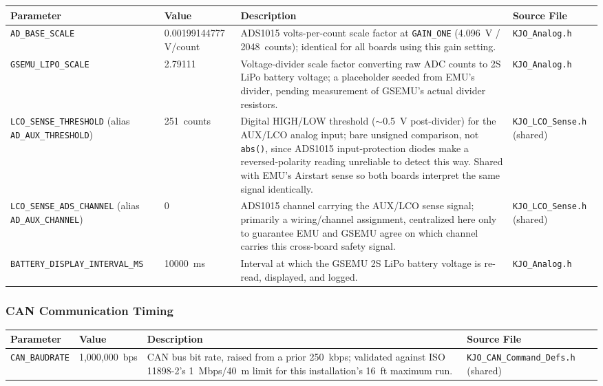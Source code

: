 ﻿\documentclass[11pt,letterpaper]{article}
\begin{document}
\begingroup
\footnotesize
\begin{longtable}{@{}p{3.2cm}p{2.4cm}p{6.2cm}p{2.6cm}@{}}
\toprule
Parameter & Value & Description & Source File \\
\midrule
\texttt{AD\_\allowbreak BASE\_\allowbreak SCALE} & 0.00199144777 V/count & ADS1015 volts-per-count scale factor at \texttt{GAIN\_\allowbreak ONE} (4.096~V / 2048~counts); identical for all boards using this gain setting. & \texttt{KJO\_\allowbreak Analog.h} \\
\texttt{GSEMU\_\allowbreak LIPO\_\allowbreak SCALE} & 2.79111 & Voltage-divider scale factor converting raw ADC counts to 2S LiPo battery voltage; a placeholder seeded from EMU's divider, pending measurement of GSEMU's actual divider resistors. & \texttt{KJO\_\allowbreak Analog.h} \\
\texttt{LCO\_\allowbreak SENSE\_\allowbreak THRESHOLD} (alias \texttt{AD\_\allowbreak AUX\_\allowbreak THRESHOLD}) & 251~counts & Digital HIGH/LOW threshold ($\sim$0.5~V post-divider) for the AUX/LCO analog input; bare unsigned comparison, not \texttt{abs()}, since ADS1015 input-protection diodes make a reversed-polarity reading unreliable to detect this way. Shared with EMU's Airstart sense so both boards interpret the same signal identically. & \texttt{KJO\_\allowbreak LCO\_\allowbreak Sense.h} (shared) \\
\texttt{LCO\_\allowbreak SENSE\_\allowbreak ADS\_\allowbreak CHANNEL} (alias \texttt{AD\_\allowbreak AUX\_\allowbreak CHANNEL}) & 0 & ADS1015 channel carrying the AUX/LCO sense signal; primarily a wiring/channel assignment, centralized here only to guarantee EMU and GSEMU agree on which channel carries this cross-board safety signal. & \texttt{KJO\_\allowbreak LCO\_\allowbreak Sense.h} (shared) \\
\texttt{BATTERY\_\allowbreak DISPLAY\_\allowbreak INTERVAL\_\allowbreak MS} & 10000~ms & Interval at which the GSEMU 2S LiPo battery voltage is re-read, displayed, and logged. & \texttt{KJO\_\allowbreak Analog.h} \\
\end{longtable}
\endgroup

\subsubsection*{CAN Communication Timing}

\begingroup
\footnotesize
\begin{longtable}{@{}p{3.2cm}p{2.4cm}p{6.2cm}p{2.6cm}@{}}
\toprule
Parameter & Value & Description & Source File \\
\midrule
\texttt{CAN\_\allowbreak BAUDRATE} & 1{,}000{,}000~bps & CAN bus bit rate, raised from a prior 250~kbps; validated against ISO 11898-2's 1~Mbps/40~m limit for this installation's 16~ft maximum run. & \texttt{KJO\_\allowbreak CAN\_\allowbreak Command\_\allowbreak Defs.h} (shared) \\
\end{longtable}
\endgroup
\end{document}
